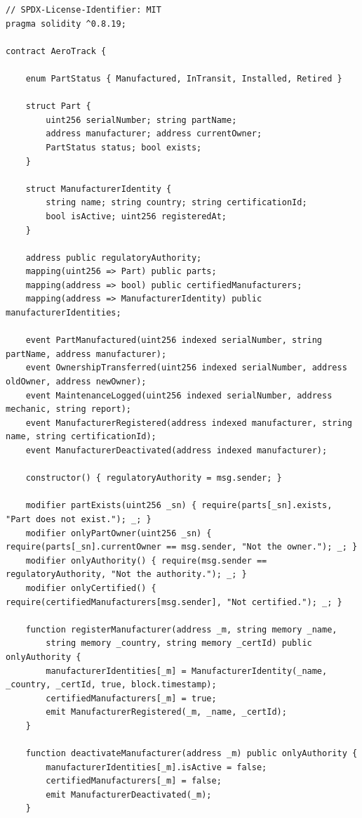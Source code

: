 \documentclass[12pt,a4paper]{article}
\begin{document}
\begin{lstlisting}[caption={Step6\_DIDs.sol -- Adds on-chain identity}]
// SPDX-License-Identifier: MIT
pragma solidity ^0.8.19;

contract AeroTrack {

    enum PartStatus { Manufactured, InTransit, Installed, Retired }

    struct Part {
        uint256 serialNumber; string partName;
        address manufacturer; address currentOwner;
        PartStatus status; bool exists;
    }

    struct ManufacturerIdentity {
        string name; string country; string certificationId;
        bool isActive; uint256 registeredAt;
    }

    address public regulatoryAuthority;
    mapping(uint256 => Part) public parts;
    mapping(address => bool) public certifiedManufacturers;
    mapping(address => ManufacturerIdentity) public manufacturerIdentities;

    event PartManufactured(uint256 indexed serialNumber, string partName, address manufacturer);
    event OwnershipTransferred(uint256 indexed serialNumber, address oldOwner, address newOwner);
    event MaintenanceLogged(uint256 indexed serialNumber, address mechanic, string report);
    event ManufacturerRegistered(address indexed manufacturer, string name, string certificationId);
    event ManufacturerDeactivated(address indexed manufacturer);

    constructor() { regulatoryAuthority = msg.sender; }

    modifier partExists(uint256 _sn) { require(parts[_sn].exists, "Part does not exist."); _; }
    modifier onlyPartOwner(uint256 _sn) { require(parts[_sn].currentOwner == msg.sender, "Not the owner."); _; }
    modifier onlyAuthority() { require(msg.sender == regulatoryAuthority, "Not the authority."); _; }
    modifier onlyCertified() { require(certifiedManufacturers[msg.sender], "Not certified."); _; }

    function registerManufacturer(address _m, string memory _name,
        string memory _country, string memory _certId) public onlyAuthority {
        manufacturerIdentities[_m] = ManufacturerIdentity(_name, _country, _certId, true, block.timestamp);
        certifiedManufacturers[_m] = true;
        emit ManufacturerRegistered(_m, _name, _certId);
    }

    function deactivateManufacturer(address _m) public onlyAuthority {
        manufacturerIdentities[_m].isActive = false;
        certifiedManufacturers[_m] = false;
        emit ManufacturerDeactivated(_m);
    }


\end{lstlisting}
\end{document}
